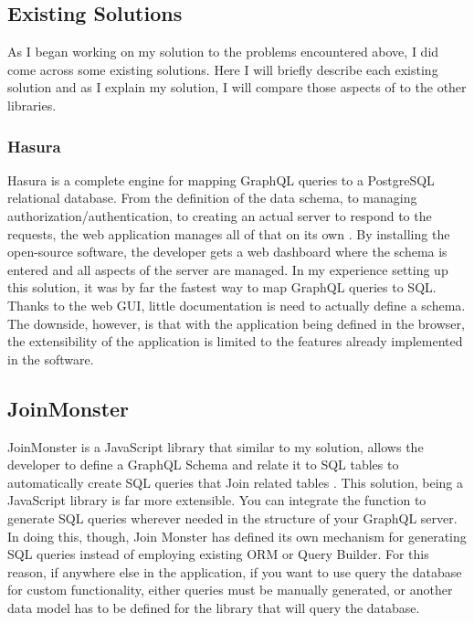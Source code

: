\subsection{Existing Solutions}

As I began working on my solution to the problems encountered above, I did come across some existing solutions.  Here I will briefly describe each existing solution and as I explain my solution, I will compare those aspects of to the other libraries.

\subsubsection{Hasura}

Hasura is a complete engine for mapping GraphQL queries to a PostgreSQL relational database. From the definition of the data schema, to managing authorization/authentication, to creating an actual server to respond to the requests, the web application manages all of that on its own \cite{hasurainc.HasuraGraphQLEngine}.  By installing the open-source software, the developer gets a web dashboard where the schema is entered and all aspects of the server are managed.  In my experience setting up this solution, it was by far the fastest way to map GraphQL queries to SQL.  Thanks to the web GUI, little documentation is need to actually define a schema.  The downside, however, is that with the application being defined in the browser, the extensibility of the application is limited to the features already implemented in the software.

\subsection{JoinMonster}

JoinMonster is a JavaScript library that similar to my solution, allows the developer to define a GraphQL Schema and relate it to SQL tables to automatically create SQL queries that Join related tables \cite{carlJoinMonster}.  This solution, being a JavaScript library is far more extensible.  You can integrate the function to generate SQL queries wherever needed in the structure of your GraphQL server.  In doing this, though, Join Monster has defined its own mechanism for generating SQL queries instead of employing existing ORM or Query Builder.  For this reason, if anywhere else in the application, if you want to use query the database for custom functionality, either queries must be manually generated, or another data model has to be defined for the library that will query the database.